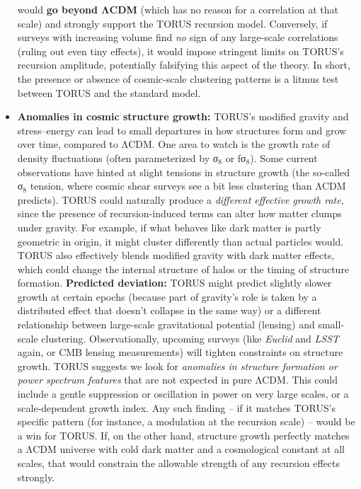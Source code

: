 \documentclass[]{article}
\newcommand{\subscript}[1]{\ensuremath{_{\mathrm{#1}}}}
\begin{document}
\begin{itemize}
  would \textbf{go beyond ΛCDM} (which has no reason for a correlation
  at that scale) and strongly support the TORUS recursion model.
  Conversely, if surveys with increasing volume find \emph{no} sign of
  any large-scale correlations (ruling out even tiny effects), it would
  impose stringent limits on TORUS's recursion amplitude, potentially
  falsifying this aspect of the theory​. In short, the presence or
  absence of cosmic-scale clustering patterns is a litmus test between
  TORUS and the standard model.
\item
  \textbf{Anomalies in cosmic structure growth:} TORUS's modified
  gravity and stress--energy can lead to small departures in how
  structures form and grow over time, compared to ΛCDM. One area to
  watch is the growth rate of density fluctuations (often parameterized
  by σ\subscript{8} or
  fσ\subscript{8}). Some
  current observations have hinted at slight tensions in structure
  growth (the so-called
  σ\subscript{8} tension,
  where cosmic shear surveys see a bit less clustering than ΛCDM
  predicts). TORUS could naturally produce a \emph{different effective
  growth rate}, since the presence of recursion-induced terms can alter
  how matter clumps under gravity. For example, if what behaves like
  dark matter is partly geometric in origin, it might cluster
  differently than actual particles would. TORUS also effectively blends
  modified gravity with dark matter effects, which could change the
  internal structure of halos or the timing of structure formation.
  \textbf{Predicted deviation:} TORUS might predict slightly slower
  growth at certain epochs (because part of gravity's role is taken by a
  distributed effect that doesn't collapse in the same way) or a
  different relationship between large-scale gravitational potential
  (lensing) and small-scale clustering. Observationally, upcoming
  surveys (like \emph{Euclid} and \emph{LSST} again, or CMB lensing
  measurements) will tighten constraints on structure growth. TORUS
  suggests we look for \emph{anomalies in structure formation or power
  spectrum features} that are not expected in pure ΛCDM​. This could
  include a gentle suppression or oscillation in power on very large
  scales, or a scale-dependent growth index. Any such finding -- if it
  matches TORUS's specific pattern (for instance, a modulation at the
  recursion scale) -- would be a win for TORUS. If, on the other hand,
  structure growth perfectly matches a ΛCDM universe with cold dark
  matter and a cosmological constant at all scales, that would constrain
  the allowable strength of any recursion effects strongly.

\end{itemize}
\end{document}
